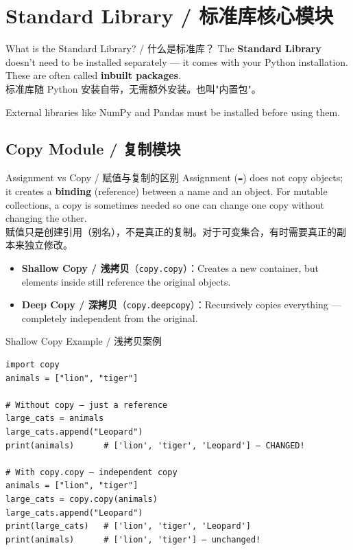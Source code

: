 \documentclass[11pt,a4paper]{report}
\let\oldtexttt\texttt
\renewcommand{\texttt}[1]{\textcolor{mainblue}{\oldtexttt{#1}}}
\begin{document}
\section{Standard Library / 标准库核心模块}

\begin{concept}{What is the Standard Library? / 什么是标准库？}
    The \textbf{Standard Library} doesn't need to be installed separately — it comes with your Python installation. These are often called \textbf{inbuilt packages}. \\
    标准库随 Python 安装自带，无需额外安装。也叫"内置包"。

    External libraries like NumPy and Pandas must be installed before using them.
\end{concept}

\subsection{Copy Module / 复制模块}

\begin{concept}{Assignment vs Copy / 赋值与复制的区别}
    Assignment (\texttt{=}) does not copy objects; it creates a \textbf{binding} (reference) between a name and an object. For mutable collections, a copy is sometimes needed so one can change one copy without changing the other. \\
    赋值只是创建引用（别名），不是真正的复制。对于可变集合，有时需要真正的副本来独立修改。

    \begin{itemize}[itemsep=0.5em]
        \item \textbf{Shallow Copy / 浅拷贝}（\texttt{copy.copy}）：Creates a new container, but elements inside still reference the original objects.
        \item \textbf{Deep Copy / 深拷贝}（\texttt{copy.deepcopy}）：Recursively copies everything — completely independent from the original.
    \end{itemize}
\end{concept}

\begin{examplebox}{Shallow Copy Example / 浅拷贝案例}
\begin{lstlisting}
import copy
animals = ["lion", "tiger"]

# Without copy — just a reference
large_cats = animals
large_cats.append("Leopard")
print(animals)      # ['lion', 'tiger', 'Leopard'] — CHANGED!

# With copy.copy — independent copy
animals = ["lion", "tiger"]
large_cats = copy.copy(animals)
large_cats.append("Leopard")
print(large_cats)   # ['lion', 'tiger', 'Leopard']
print(animals)      # ['lion', 'tiger'] — unchanged!
\end{lstlisting}
\end{examplebox}
\end{document}
